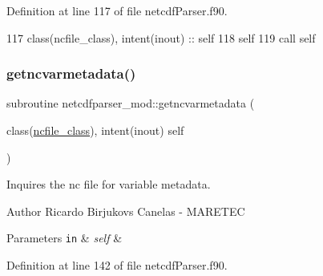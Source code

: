 Definition at line 117 of file netcdf\+Parser.\+f90.


\begin{DoxyCode}
117     \textcolor{keywordtype}{class}(ncfile\_class), \textcolor{keywordtype}{intent(inout)} :: self
118     self%
119     \textcolor{keyword}{call }self%
\end{DoxyCode}
\mbox{\label{namespacenetcdfparser__mod_a46989199271acb6205cc61ac413d5a56}} 
\subsubsection{\texorpdfstring{getncvarmetadata()}{getncvarmetadata()}}
{\footnotesize\ttfamily subroutine netcdfparser\+\_\+mod\+::getncvarmetadata (\begin{DoxyParamCaption}\item[{class(\mbox{\hyperlink{structnetcdfparser__mod_1_1ncfile__class}{ncfile\+\_\+class}}), intent(inout)}]{self }\end{DoxyParamCaption})\hspace{0.3cm}{\ttfamily [private]}}



Inquires the nc file for variable metadata. 

\begin{DoxyAuthor}{Author}
Ricardo Birjukovs Canelas -\/ M\+A\+R\+E\+T\+EC 
\end{DoxyAuthor}

\begin{DoxyParams}[1]{Parameters}
\mbox{\tt in}  & {\em self} & \\
\hline
\end{DoxyParams}


Definition at line 142 of file netcdf\+Parser.\+f90.


